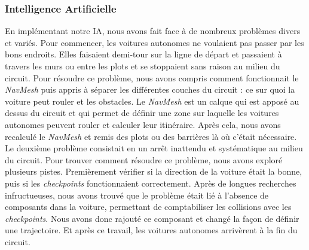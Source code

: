 \documentclass[a4paper,12pt]{article}
\newcommand{\AI}{Intelligence Artificielle}
\begin{document}
            \subsubsection{\AI}
                En implémentant notre IA, nous avons fait face à de nombreux problèmes divers et variés. Pour 
                commencer, les voitures autonomes ne voulaient pas passer par les bons endroits. Elles 
                faisaient demi-tour sur la ligne de départ et passaient à travers les murs ou entre les 
                plots et se stoppaient sans raison au milieu du circuit. Pour résoudre ce problème, nous
                avons compris comment fonctionnait le \textit{NavMesh} puis appris à séparer les 
                différentes couches du circuit : ce sur quoi la voiture peut rouler et les obstacles. Le 
                \textit{NavMesh} est un calque qui est apposé au dessus du circuit et qui permet de
                définir une zone sur laquelle les voitures autonomes peuvent rouler et calculer leur
                itinéraire. Après cela, nous avons recalculé le \textit{NavMesh} et remis des plots
                ou des barrières là où c'était nécessaire.\\
                Le deuxième problème consistait en un arrêt inattendu et systématique au milieu du 
                circuit. Pour trouver comment résoudre ce problème, nous avons exploré plusieurs pistes. Premièrement vérifier si la direction de la voiture était la bonne, puis si les 
                \textit{checkpoints} fonctionnaient correctement. Après de longues recherches 
                infructueuses, nous avons trouvé que le problème était lié à l'absence de composants 
                dans la voiture, permettant de comptabiliser les collisions avec les 
                \textit{checkpoints}. Nous avons donc rajouté ce composant et changé la façon de définir
                une trajectoire. Et après ce travail, les voitures autonomes arrivèrent à la fin du 
                circuit.
\end{document}

